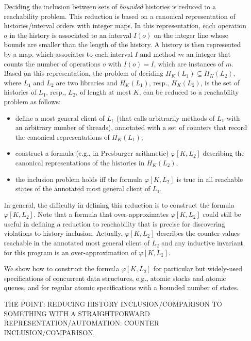 Deciding the inclusion between sets of \emph{bounded} histories is reduced to a reachability problem. This reduction
is based on a canonical representation of histories/interval orders with integer maps. In this representation, each operation $o$ in the history
is associated to an interval $I(o)$ on the integer line whose bounds are smaller than the length of the history. A history is then 
represented by a map, which associates to each interval $I$ and method $m$ an integer that counts the number of operations 
$o$ with $I(o)=I$, which are instances of $m$. Based on this representation, the problem of deciding $H_K(L_1)\subseteq H_K(L_2)$, where
$L_1$ and $L_2$ are two libraries and $H_K(L_1)$, resp., $H_K(L_2)$, is the set of histories of $L_1$, resp., $L_2$, of length at most $K$, can be reduced to
a reachability problem as follows:
\begin{itemize}
	\item define a most general client of $L_1$ (that calls arbitrarily methods of $L_1$ with an arbitrary number of threads), annotated 
with a set of counters that record the canonical representations of $H_K(L_1)$,
	\item construct a formula (e.g., in Presburger arithmetic) $\varphi[K,L_2]$ describing the canonical representations of the histories in $H_K(L_2)$,
	\item the inclusion problem holds iff the formula $\varphi[K,L_2]$ is true in all reachable states of the annotated most general client of $L_1$.
\end{itemize}

In general, the difficulty in defining this reduction is to construct the formula $\varphi[K,L_2]$. 
Note that a formula that over-approximates $\varphi[K,L_2]$ could still be useful in defining a reduction to reachability 
that is precise for discovering violations to history inclusion. Actually, $\varphi[K,L_2]$ describes the counter values reachable
in the annotated most general client of $L_2$ and any inductive invariant for this program is an over-approximation of $\varphi[K,L_2]$. 

We show how to construct the formula $\varphi[K,L_2]$ for particular but widely-used specifications of concurrent data structures, 
e.g., atomic stacks and atomic queues, and for regular atomic specifications with a bounded number of states.

THE POINT: REDUCING HISTORY INCLUSION/COMPARISON TO SOMETHING WITH A
STRAIGHTFORWARD REPRESENTATION/AUTOMATION: COUNTER INCLUSION/COMPARISON.

